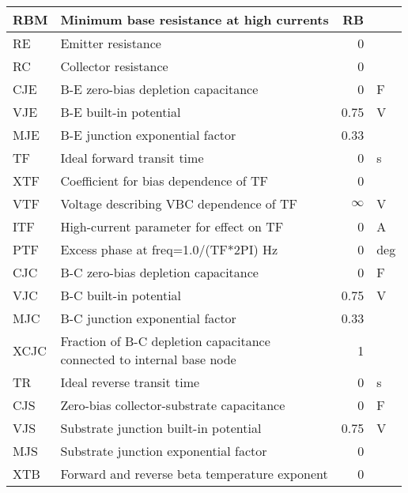 \begin{center}
\begin{longtable}{|l|l|r l|}
\color{lightgray}	RBM 	&	\color{lightgray}	Minimum base resistance at high currents	&	\color{lightgray}	RB  &	\color{lightgray}	 	 \\ \hline
RE 	&		Emitter resistance	&		0 	&	   	 	 \\ \hline
RC 	&		Collector resistance 	&		0 	&	   	 	 \\ \hline
CJE 	&		B-E zero-bias depletion capacitance	&		0 	&	   	F 	 \\ \hline
VJE 	&		B-E built-in potential	&		0.75    &		V 	 \\ \hline
MJE 	&		B-E junction exponential factor 	&		0.33    &		 	 \\ \hline
TF 	&		Ideal forward transit time 	&		0 	&	   	s 	 \\ \hline
\color{lightgray}	XTF	&	\color{lightgray}	Coefficient for bias dependence of TF 	&	\color{lightgray}	0 	&	\color{lightgray}   	 	 \\ \hline
\color{lightgray}	VTF 	&	\color{lightgray}	Voltage describing VBC dependence of TF 	&	\color{lightgray}	$ \infty{}$    &	\color{lightgray}	V 	 \\ \hline
\color{lightgray}	ITF 	&	\color{lightgray}	High-current parameter  for effect on TF 	&	\color{lightgray}	0 	&	\color{lightgray}   	A 	 \\ \hline
\color{lightgray}	PTF 	&	\color{lightgray}	Excess phase at freq=1.0/(TF*2PI) Hz 	&	\color{lightgray}	0 	&	\color{lightgray}   	deg 	 \\ \hline
CJC 	&		B-C zero-bias depletion capacitance 	&		0 	&	   	F 	 \\ \hline
VJC 	&		B-C built-in potential 	&		0.75    &		V 	 \\ \hline
MJC 	&		B-C junction exponential factor 	&		0.33    &		 	 \\ \hline
\color{lightgray}	XCJC 	&	\color{lightgray}	\makecell[l]{Fraction of B-C depletion capacitance \\ connected to internal base node} 	&	\color{lightgray}	1 	&	\color{lightgray}   	 	 \\ \hline
TR 	&		Ideal reverse transit time 	&		0 	&	   	s 	 \\ \hline
CJS 	&		Zero-bias collector-substrate capacitance 	&		0 	&	   	F 	 \\ \hline
VJS 	&		Substrate junction built-in potential 	&		0.75    &		V 	 \\ \hline
MJS 	&		Substrate junction exponential factor 	&		0 	&	   	 	 \\ \hline
\color{lightgray}	XTB 	&	\color{lightgray}	Forward and reverse beta  temperature exponent 	&	\color{lightgray}	0 	&	\color{lightgray}   	 	 \\ \hline

\end{longtable}
\end{center}
